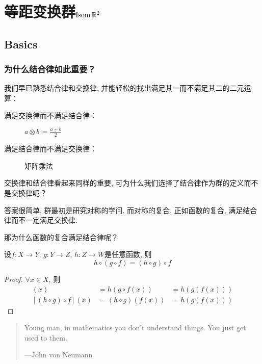 \chapter{等距变换群\(\operatorname{\mathrm{Isom}} \mathbb{R}^{2}\)}

\section{Basics}

\subsection{为什么结合律如此重要？}
我们早已熟悉结合律和交换律, 并能轻松的找出满足其一而不满足其二的二元运算：

\begin{description}
    \item[满足交换律而不满足结合律：] \(a \otimes b \coloneq \frac{a+b}{2}\)
    \item[满足结合律而不满足交换律：] 矩阵乘法
\end{description}

交换律和结合律看起来同样的重要, 可为什么我们选择了结合律作为群的定义而不是交换律呢？

答案很简单, 群最初是研究对称的学问. 而对称的复合, 正如函数的复合, 满足结合律而不一定满足交换律.

那为什么函数的复合满足结合律呢？

\begin{theorem}
    设\(f: X\to Y\), \(g: Y\to Z\), \(h: Z\to W\)是任意函数, 则
    \[
        h\circ(g\circ f)=(h\circ g)\circ f
    \]
\end{theorem}

\begin{proof}
    \(\forall x\in X\), 则
    \begin{align*}
        [h\circ(g\circ f)](x) & = h(g \circ f(x))  & = h(g(f(x))) \\
        [(h\circ g)\circ f](x) & = (h\circ g)(f(x)) & = h(g(f(x)))
    \end{align*}
\end{proof}

\begin{quote}
    Young man, in mathematics you don't understand things.
    You just get used to them.

    \hfill ---John von Neumann
\end{quote}

